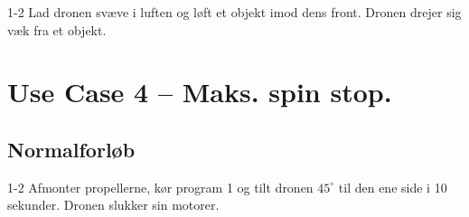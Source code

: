 \documentclass[Main]{subfiles}
\begin{document}
\begin{TestCaseIntro}
\end{TestCaseIntro}

\begin{TestCase}
\TC
{1-2}
{Lad dronen svæve i luften og løft et objekt imod dens front.}
{Dronen drejer sig væk fra et objekt.}

\end{TestCase}






\newpage
\section{Use Case 4 -- Maks. spin stop.}
\subsection*{Normalforløb}

\begin{TestCaseIntro}
\end{TestCaseIntro}

\begin{TestCase}
\TC
{1-2}
{Afmonter propellerne, kør program 1 og tilt dronen $45^\circ$ til den ene side i 10 sekunder.}
{Dronen slukker sin motorer.}
{}
\end{TestCase}
\end{document}
